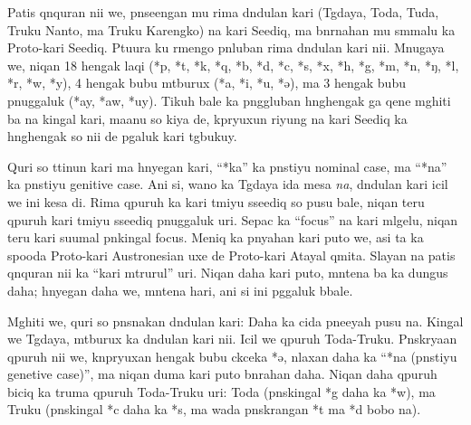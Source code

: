 \vspace{-1.15cm}

Patis qnquran nii we, pnseengan mu rima dndulan kari (Tgdaya, Toda, Tuda, Truku Nanto, ma Truku Karengko) na kari Seediq, ma bnrnahan mu smmalu ka Proto-kari Seediq. Ptuura ku rmengo pnluban rima dndulan kari nii. Mnugaya we, niqan 18 hengak laqi (*p, *t, *k, *q, *b, *d, *c, *s, *x, *h, *g, *m, *n, *ŋ, *l, *r, *w, *y), 4 hengak bubu mtburux (*a, *i, *u, *ə), ma 3 hengak bubu pnuggaluk (*ay, *aw, *uy). Tikuh bale ka pnggluban hnghengak ga qene mghiti ba na kingal kari, maanu so kiya de, kpryuxun riyung na kari Seediq ka hnghengak so nii de pgaluk kari tgbukuy.

Quri so ttinun kari ma hnyegan kari, ``*ka'' ka pnstiyu nominal case, ma ``*na'' ka pnstiyu genitive case. Ani si, wano ka Tgdaya ida mesa \textit{na}, dndulan kari icil we ini kesa di. Rima qpuruh ka kari tmiyu sseediq so pusu bale, niqan teru qpuruh kari tmiyu sseediq pnuggaluk uri. Sepac ka ``focus'' na kari mlgelu, niqan teru kari suumal pnkingal focus. Meniq ka pnyahan kari puto we, asi ta ka spooda Proto-kari Austronesian uxe de Proto-kari Atayal qmita. Slayan na patis qnquran nii ka ``kari mtrurul'' uri. Niqan daha kari puto, mntena ba ka dungus daha; hnyegan daha we, mntena hari, ani si ini pggaluk bbale. 

Mghiti we, quri so pnsnakan dndulan kari: Daha ka cida pneeyah pusu na. Kingal we Tgdaya, mtburux ka dndulan kari nii. Icil we qpuruh Toda-Truku. Pnskryaan qpuruh nii we, knpryuxan hengak bubu ckceka *ə, nlaxan daha ka ``*na (pnstiyu genetive case)'', ma niqan duma kari puto bnrahan daha. Niqan daha qpuruh biciq ka truma qpuruh Toda-Truku uri: Toda (pnskingal *g daha ka *w), ma Truku (pnskingal *c daha ka *s, ma wada pnskrangan *t ma *d bobo na).